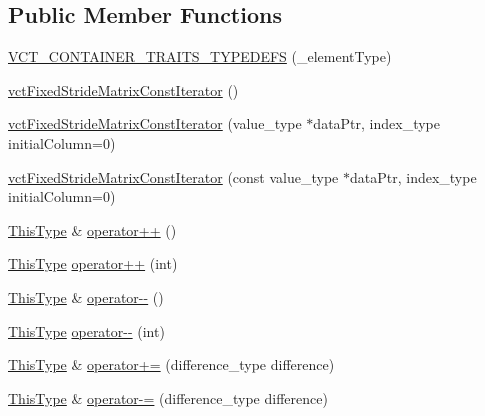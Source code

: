 \subsection*{Public Member Functions}
\begin{DoxyCompactItemize}
\item 
\hyperlink{classvct_fixed_stride_matrix_const_iterator_a541c4cd5b94e8c08a1553a3c211848e7}{V\-C\-T\-\_\-\-C\-O\-N\-T\-A\-I\-N\-E\-R\-\_\-\-T\-R\-A\-I\-T\-S\-\_\-\-T\-Y\-P\-E\-D\-E\-F\-S} (\-\_\-element\-Type)
\item 
\hyperlink{classvct_fixed_stride_matrix_const_iterator_a4644c0f472f4c2a3806234f3b2450ce8}{vct\-Fixed\-Stride\-Matrix\-Const\-Iterator} ()
\item 
\hyperlink{classvct_fixed_stride_matrix_const_iterator_a5012cf6434dad743191cdb01ea629c04}{vct\-Fixed\-Stride\-Matrix\-Const\-Iterator} (value\-\_\-type $\ast$data\-Ptr, index\-\_\-type initial\-Column=0)
\item 
\hyperlink{classvct_fixed_stride_matrix_const_iterator_af63cd0ec36f1b4d439adad1d530ac4b4}{vct\-Fixed\-Stride\-Matrix\-Const\-Iterator} (const value\-\_\-type $\ast$data\-Ptr, index\-\_\-type initial\-Column=0)
\item 
\hyperlink{classvct_fixed_stride_matrix_const_iterator_a8c6ee7d655fb71d647506c3964a18e2c}{This\-Type} \& \hyperlink{classvct_fixed_stride_matrix_const_iterator_a7e3ed2cac501b2f99adcdd8e355e8cf8}{operator++} ()
\item 
\hyperlink{classvct_fixed_stride_matrix_const_iterator_a8c6ee7d655fb71d647506c3964a18e2c}{This\-Type} \hyperlink{classvct_fixed_stride_matrix_const_iterator_a73e40c4e9c90b8ab703ceb8aae6c0426}{operator++} (int)
\item 
\hyperlink{classvct_fixed_stride_matrix_const_iterator_a8c6ee7d655fb71d647506c3964a18e2c}{This\-Type} \& \hyperlink{classvct_fixed_stride_matrix_const_iterator_a19c6f1350bcf8d0db440f832870ddf4b}{operator-\/-\/} ()
\item 
\hyperlink{classvct_fixed_stride_matrix_const_iterator_a8c6ee7d655fb71d647506c3964a18e2c}{This\-Type} \hyperlink{classvct_fixed_stride_matrix_const_iterator_ab8a278eb0e02d3e98513890d2fb9f726}{operator-\/-\/} (int)
\item 
\hyperlink{classvct_fixed_stride_matrix_const_iterator_a8c6ee7d655fb71d647506c3964a18e2c}{This\-Type} \& \hyperlink{classvct_fixed_stride_matrix_const_iterator_a3abb15d006f47ef4e75603ea76baf028}{operator+=} (difference\-\_\-type difference)
\item 
\hyperlink{classvct_fixed_stride_matrix_const_iterator_a8c6ee7d655fb71d647506c3964a18e2c}{This\-Type} \& \hyperlink{classvct_fixed_stride_matrix_const_iterator_afedf18d6caeb6f8c73786852fab902b3}{operator-\/=} (difference\-\_\-type difference)

\end{DoxyCompactItemize}
